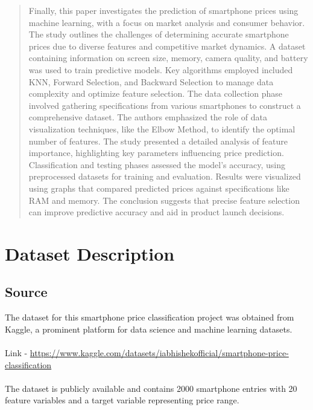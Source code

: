 \documentclass[12pt]{report}
\begin{document}
\begin{quotation}
  Finally, this paper \cite{kumuda2021} investigates the prediction of smartphone prices using machine learning, with a focus on market analysis and consumer behavior. The study outlines the challenges of determining accurate smartphone prices due to diverse features and competitive market dynamics. A dataset containing information on screen size, memory, camera quality, and battery was used to train predictive models. Key algorithms employed included KNN, Forward Selection, and Backward Selection to manage data complexity and optimize feature selection. The data collection phase involved gathering specifications from various smartphones to construct a comprehensive dataset. The authors emphasized the role of data visualization techniques, like the Elbow Method, to identify the optimal number of features. The study presented a detailed analysis of feature importance, highlighting key parameters influencing price prediction. Classification and testing phases assessed the model's accuracy, using preprocessed datasets for training and evaluation. Results were visualized using graphs that compared predicted prices against specifications like RAM and memory. The conclusion suggests that precise feature selection can improve predictive accuracy and aid in product launch decisions.
\end{quotation}


\chapter{Dataset Description}
\section{Source}
The dataset for this smartphone price classification project was obtained from Kaggle, a prominent platform for data science and machine learning datasets.\\ \\
Link - \href{https://www.kaggle.com/datasets/iabhishekofficial/mobile-price-classification?select=train.csv}{https://www.kaggle.com/datasets/iabhishekofficial/smartphone-price-classification}\\ \\
The dataset is publicly available and contains 2000 smartphone entries with 20 feature variables and a target variable representing price range.
\end{document}
